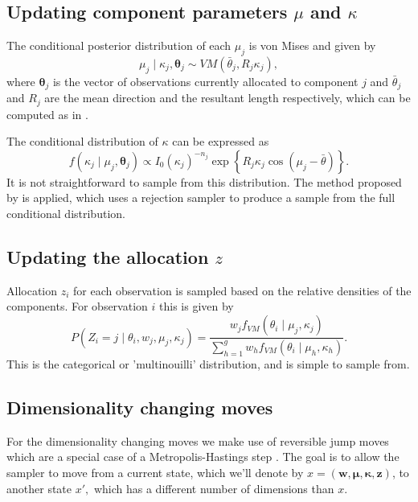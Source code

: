 \subsection{Updating component parameters $\mu$ and $\kappa$}

The conditional posterior distribution of each $\mu_j$ is von Mises and given by
\begin{equation}
\mu_j \mid \kappa_j, \bm{\theta}_j \sim VM\left(\bar{\theta}_j, R_{j} \kappa_j\right),
\end{equation}
where $\bm{\theta}_j$ is the vector of observations currently allocated to component $j$ and $\bar{\theta}_j$ and $R_{j}$ are the mean direction and the resultant length respectively, which can be computed as in \citep[p. 15]{Mardia2009}.

The conditional distribution of $\kappa$ can be expressed as
\begin{equation}
f(\kappa_j \mid \mu_j, \bm{\theta}_j) \propto {I_0(\kappa_j)}^{-n_j} \exp\left\{R_{j} \kappa_j \cos\left(\mu_j - \bar{\theta}\right)\right\}.
\end{equation}
It is not straightforward to sample from this distribution. The method proposed by \citet{Forbes:2014ju} is applied, which uses a rejection sampler to produce a sample from the full conditional distribution.

\subsection{Updating the allocation $z$}
Allocation $z_i$ for each observation is sampled based on the relative densities of the components. For observation $i$ this is given by
\begin{equation}
P(Z_i = j \mid \theta_i, w_j, \mu_j, \kappa_j) = \frac{w_j f_{VM}(\theta_i \mid \mu_j, \kappa_j)}{\sum^g_{h=1} w_h f_{VM}(\theta_i \mid \mu_h, \kappa_h)}.
\end{equation}
This is the categorical or 'multinouilli' distribution, and is simple to sample from.

\subsection{Dimensionality changing moves}
For the dimensionality changing moves we make use of reversible jump moves which are a special case of a Metropolis-Hastings step \citep{Richardson:1997di}. The goal is to allow the sampler to move from a current state, which we'll denote by $x = (\bm w, \bm \mu, \bm \kappa, \bm z)$, to another state $x',$ which has a different number of dimensions than $x$. 


